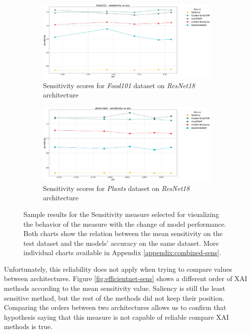 \vspace{-12pt}
\begin{figure}[ht]
  \centering
 \begin{subfigure}{.40\textwidth}
    \centering
    \includegraphics[width=\textwidth]{results/metrics/resnet18-food101-sensitivity vs acc.jpg}
    \caption{Sensitivity scores for \textit{Food101} dataset on \textit{ResNet18} architecture}\label{fig:resnet-sens-food101}
\end{subfigure}
 \begin{subfigure}{.40\textwidth}
    \centering
    \includegraphics[width=\textwidth]{results/metrics/resnet18-plant-data-sensitivity vs acc.jpg}
    \caption{Sensitivity scores for \textit{Plants} dataset on \textit{ResNet18} architecture}\label{fig:resnet-sens-plants}
\end{subfigure}

 \caption{Sample results for the Sensitivity measure selected for visualizing the behavior of the measure with the change of model performance. Both charts show the relation between the mean sensitivity on the test dataset and the models' accuracy on the same dataset. More individual charts available in Appendix \ref{appendix:combined-sens}.}\label{fig:sens-metrics-examples}
\end{figure}

\FloatBarrier

Unfortunately, this reliability does not apply when trying to compare values between architectures. Figure \ref{fig:efficientnet-sens} shows a different order of XAI methods according to the mean sensitivity value. Saliency is still the least sensitive method, but the rest of the methods did not keep their position. Comparing the orders between two architectures allows us to confirm that hypothesis saying that this measure is not capable of reliable compare XAI methods is true.

